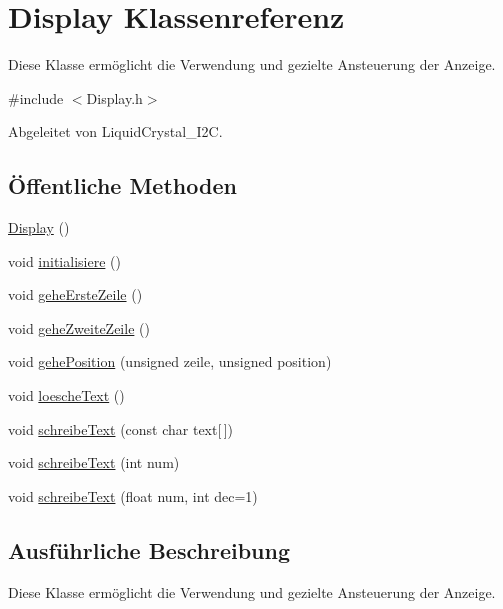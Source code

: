 \hypertarget{classDisplay}{}\section{Display Klassenreferenz}
\label{classDisplay}


Diese Klasse ermöglicht die Verwendung und gezielte Ansteuerung der Anzeige.  




{\ttfamily \#include $<$Display.\+h$>$}



Abgeleitet von Liquid\+Crystal\+\_\+\+I2C.

\subsection*{Öffentliche Methoden}
\begin{DoxyCompactItemize}
\item 
\hyperlink{classDisplay_ae972fffea6f7ca1d627ef48c3d841bb3}{Display} ()
\item 
void \hyperlink{classDisplay_a746cc0e165c8f6fc35a1f6bb16c74a0a}{initialisiere} ()
\item 
void \hyperlink{classDisplay_a7b856d13f5f03cb2a198fb8f85a213a5}{gehe\+Erste\+Zeile} ()
\item 
void \hyperlink{classDisplay_a31c0f6bc50fa4b78bad8baaf39654f49}{gehe\+Zweite\+Zeile} ()
\item 
void \hyperlink{classDisplay_aa700cc9433e5c23c85a96c0948474ca5}{gehe\+Position} (unsigned zeile, unsigned position)
\item 
void \hyperlink{classDisplay_a9fdfb71b4f4e2e4ce3bbcf890ddc90d6}{loesche\+Text} ()
\item 
void \hyperlink{classDisplay_aa96269016194574064e9ac75e680162d}{schreibe\+Text} (const char text\mbox{[}$\,$\mbox{]})
\item 
void \hyperlink{classDisplay_a72496b503a980df37e0fbad379117f75}{schreibe\+Text} (int num)
\item 
void \hyperlink{classDisplay_a5442ed91fc0bb8e5fca54637661eff5f}{schreibe\+Text} (float num, int dec=1)
\end{DoxyCompactItemize}


\subsection{Ausführliche Beschreibung}
Diese Klasse ermöglicht die Verwendung und gezielte Ansteuerung der Anzeige. 

